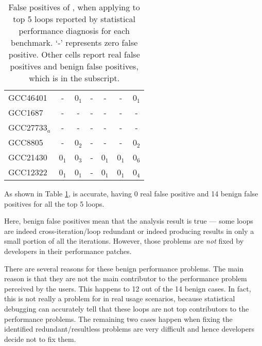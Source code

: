\begin{table}
\begin{tabular}{lcccccc}
   \midrule
   GCC46401              &   -                  & 0$_1$                       & -                       & -                     &   -             & 0$_1$\\
   GCC1687               &   -                  & -                           & -                       & -                     &   -             & -\\
   GCC27733$_a$          &   -                  & -                           & -                       & -                     &   -             & - \\
   GCC8805               &   -                  & 0$_2$                       & -                       & -                     &   -             & 0$_2$\\
   GCC21430              &   0$_1$              & 0$_3$                       & -                       & 0$_1$                 &   0$_1$         & 0$_6$\\
   GCC12322              &   0$_1$              & 0$_1$                       & -                       & 0$_1$                 &   0$_1$         & 0$_4$\\
\bottomrule
   \end{tabular}
  \caption{False positives of \Tool, when applying to top 5 loops reported by 
    statistical performance diagnosis for each benchmark. `-' represents zero false positive.
    Other cells report real false positives and benign false positives, which is in the
    subscript.
}
  \label{tab:top5}
\end{table}

As shown in Table \ref{tab:top5}, \Tool is accurate, having 0 real
false positive and 14 benign false positives for all the top 5 loops.

Here, benign false positives mean that the \Tool analysis result is true ---
some loops are indeed cross-iteration/loop redundant or indeed producing
results in only a small portion of all the iterations. However, those
problems are \textit{not} fixed by developers in their performance patches. 

There are several reasons for these benign performance problems. 
The main reason is that they are not the main contributor to the 
performance problem perceived by the users. This happens to 12 out of the
14 benign cases. In fact, this is not really a problem for \Tool in 
real usage scenarios, because statistical debugging can accurately
tell that these loops are not top contributors to the performance
problems.
The remaining two cases happen when fixing the 
identified redundant/resultless problems
are very difficult and hence developers decide not to fix them.

